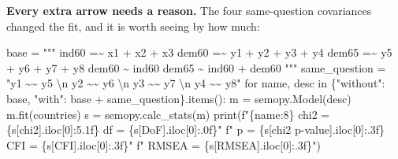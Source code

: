 \documentclass[
  letterpaper,
  10pt,
  twoside,
  openright,
  numbers=noenddot,
  chapterprefix=true]{scrbook}
\newenvironment{Shaded}{}{}
\newcommand{\BuiltInTok}[1]{\textcolor[rgb]{0.84,0.23,0.29}{#1}}
\newcommand{\CharTok}[1]{\textcolor[rgb]{0.01,0.18,0.38}{#1}}
\newcommand{\ControlFlowTok}[1]{\textcolor[rgb]{0.84,0.23,0.29}{#1}}
\newcommand{\DecValTok}[1]{\textcolor[rgb]{0.00,0.36,0.77}{#1}}
\newcommand{\KeywordTok}[1]{\textcolor[rgb]{0.84,0.23,0.29}{#1}}
\newcommand{\NormalTok}[1]{\textcolor[rgb]{0.14,0.16,0.18}{#1}}
\newcommand{\OperatorTok}[1]{\textcolor[rgb]{0.14,0.16,0.18}{#1}}
\newcommand{\SpecialCharTok}[1]{\textcolor[rgb]{0.00,0.36,0.77}{#1}}
\newcommand{\SpecialStringTok}[1]{\textcolor[rgb]{0.01,0.18,0.38}{#1}}
\newcommand{\StringTok}[1]{\textcolor[rgb]{0.01,0.18,0.38}{#1}}
\begin{document}
\textbf{Every extra arrow needs a reason.} The four same-question
covariances changed the fit, and it is worth seeing by how much:

\label{check-pd-covariances}
\begin{Shaded}
\begin{Highlighting}[]
\NormalTok{base }\OperatorTok{=} \StringTok{"""}
\StringTok{ind60 =\textasciitilde{} x1 + x2 + x3}
\StringTok{dem60 =\textasciitilde{} y1 + y2 + y3 + y4}
\StringTok{dem65 =\textasciitilde{} y5 + y6 + y7 + y8}
\StringTok{dem60 \textasciitilde{} ind60}
\StringTok{dem65 \textasciitilde{} ind60 + dem60}
\StringTok{"""}
\NormalTok{same\_question }\OperatorTok{=} \StringTok{"y1 \textasciitilde{}\textasciitilde{} y5 }\CharTok{\textbackslash{}n}\StringTok{ y2 \textasciitilde{}\textasciitilde{} y6 }\CharTok{\textbackslash{}n}\StringTok{ y3 \textasciitilde{}\textasciitilde{} y7 }\CharTok{\textbackslash{}n}\StringTok{ y4 \textasciitilde{}\textasciitilde{} y8"}
\ControlFlowTok{for}\NormalTok{ name, desc }\KeywordTok{in}\NormalTok{ \{}\StringTok{"without"}\NormalTok{: base, }\StringTok{"with"}\NormalTok{: base }\OperatorTok{+}\NormalTok{ same\_question\}.items():}
\NormalTok{    m }\OperatorTok{=}\NormalTok{ semopy.Model(desc)}
\NormalTok{    m.fit(countries)}
\NormalTok{    s }\OperatorTok{=}\NormalTok{ semopy.calc\_stats(m)}
    \BuiltInTok{print}\NormalTok{(}\SpecialStringTok{f"}\SpecialCharTok{\{}\NormalTok{name}\SpecialCharTok{:8\}}\SpecialStringTok{ chi2 = }\SpecialCharTok{\{}\NormalTok{s[}\StringTok{\textquotesingle{}chi2\textquotesingle{}}\NormalTok{]}\SpecialCharTok{.}\NormalTok{iloc[}\DecValTok{0}\NormalTok{]}\SpecialCharTok{:5.1f\}}\SpecialStringTok{  df = }\SpecialCharTok{\{}\NormalTok{s[}\StringTok{\textquotesingle{}DoF\textquotesingle{}}\NormalTok{]}\SpecialCharTok{.}\NormalTok{iloc[}\DecValTok{0}\NormalTok{]}\SpecialCharTok{:.0f\}}\SpecialStringTok{"}
          \SpecialStringTok{f"  p = }\SpecialCharTok{\{}\NormalTok{s[}\StringTok{\textquotesingle{}chi2 p{-}value\textquotesingle{}}\NormalTok{]}\SpecialCharTok{.}\NormalTok{iloc[}\DecValTok{0}\NormalTok{]}\SpecialCharTok{:.3f\}}\SpecialStringTok{  CFI = }\SpecialCharTok{\{}\NormalTok{s[}\StringTok{\textquotesingle{}CFI\textquotesingle{}}\NormalTok{]}\SpecialCharTok{.}\NormalTok{iloc[}\DecValTok{0}\NormalTok{]}\SpecialCharTok{:.3f\}}\SpecialStringTok{"}
          \SpecialStringTok{f"  RMSEA = }\SpecialCharTok{\{}\NormalTok{s[}\StringTok{\textquotesingle{}RMSEA\textquotesingle{}}\NormalTok{]}\SpecialCharTok{.}\NormalTok{iloc[}\DecValTok{0}\NormalTok{]}\SpecialCharTok{:.3f\}}\SpecialStringTok{"}\NormalTok{)}
\end{Highlighting}
\end{Shaded}
\end{document}
